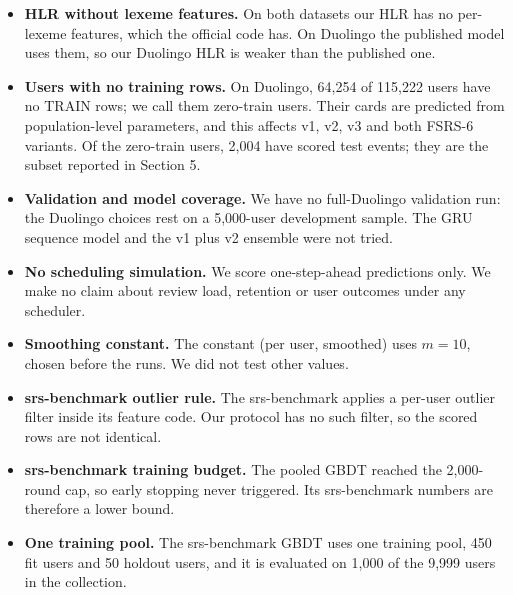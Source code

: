 \begin{itemize}
\item \textbf{HLR without lexeme features.} On both datasets our HLR has no per-lexeme features, which the official code has. On Duolingo the published model uses them, so our Duolingo HLR is weaker than the published one.
\item \textbf{Users with no training rows.} On Duolingo, 64,254 of 115,222 users have no TRAIN rows; we call them zero-train users. Their cards are predicted from population-level parameters, and this affects v1, v2, v3 and both FSRS-6 variants. Of the zero-train users, 2,004 have scored test events; they are the subset reported in Section 5.
\item \textbf{Validation and model coverage.} We have no full-Duolingo validation run: the Duolingo choices rest on a 5,000-user development sample. The GRU sequence model and the v1 plus v2 ensemble were not tried.
\item \textbf{No scheduling simulation.} We score one-step-ahead predictions only. We make no claim about review load, retention or user outcomes under any scheduler.
\item \textbf{Smoothing constant.} The constant (per user, smoothed) uses $m = 10$, chosen before the runs. We did not test other values.
\item \textbf{srs-benchmark outlier rule.} The srs-benchmark applies a per-user outlier filter inside its feature code. Our protocol has no such filter, so the scored rows are not identical.
\item \textbf{srs-benchmark training budget.} The pooled GBDT reached the 2,000-round cap, so early stopping never triggered. Its srs-benchmark numbers are therefore a lower bound.
\item \textbf{One training pool.} The srs-benchmark GBDT uses one training pool, 450 fit users and 50 holdout users, and it is evaluated on 1,000 of the 9,999 users in the collection.
\end{itemize}
